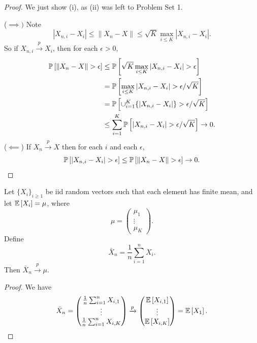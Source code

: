 \begin{proof} We just show (i), as (ii) was left to Problem Set 1.

	($\implies)$ Note
	\[
		|X_{n,i}-X_i|\le \|X_n-X\|\le \sqrt{K}\max_{i\le K}|X_{n,i}-X_i|.
	\]
	So if $X_{n,i}\xrightarrow{p}X_i$, then for each $\epsilon>0$,
	\begin{align*}
		\P\left[\|X_n-X\|>\epsilon\right]
		 & \le \P\left[\sqrt{K}\max_{i\le K}|X_{n,i}-X_i|>\epsilon\right]                          \\
		 & =\P\left[\max_{i\le K}|X_{n,i}-X_i|>\epsilon/\sqrt{K}\right]                            \\
		 & = \P\left[\cup_{i=1}^{K} \{\left| X_{n,i} - X_i \right| \}> \epsilon / \sqrt{K} \right] \\
		 & \le \sum_{i=1}^K \P\left[|X_{n,i}-X_i|>\epsilon/\sqrt{K}\right]\to 0.
	\end{align*}
	($\impliedby$) If $X_n\xrightarrow{p}X$ then for each $i$ and each $\epsilon$,
	\[
		\P\left[|X_{n,i}-X_i|>\epsilon\right]\le \P\left[\|X_n-X\|>\epsilon\right]\to 0.
	\]
\end{proof}

\begin{theorem}
	Let $\{X_i\}_{i\ge 1}$ be iid random vectors such that each element has finite mean, and let $\mathbb{E}\left[X_i\right]=\mu$, where
	\[
		\mu=\begin{pmatrix}\mu_1\\ \vdots\\ \mu_K\end{pmatrix}.
	\]
	Define
	\[
		\bar X_n=\frac{1}{n}\sum_{i=1}^n X_i.
	\]
	Then $\bar X_n\xrightarrow{p}\mu$.
\end{theorem}

\begin{proof}
	We have
	\[
		\bar X_n=\begin{pmatrix}
			\frac{1}{n}\sum_{i=1}^n X_{i,1} \\
			\vdots                          \\
			\frac{1}{n}\sum_{i=1}^n X_{i,K}
		\end{pmatrix}\xrightarrow{p}
		\begin{pmatrix}
			\mathbb{E}\left[X_{i,1}\right] \\
			\vdots             \\
			\mathbb{E}\left[X_{i,K}\right]
		\end{pmatrix}
		=\mathbb{E}\left[X_1\right].
	\]
\end{proof}

